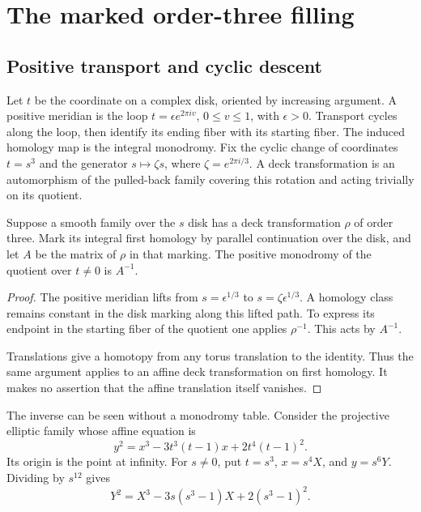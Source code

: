 \section{The marked order-three filling}\label{sec:order-three}

\subsection{Positive transport and cyclic descent}

Let $t$ be the coordinate on a complex disk, oriented by increasing
argument. A positive meridian is the loop $t=\epsilon e^{2\pi iv}$,
$0\le v\le1$, with $\epsilon>0$. Transport cycles along the loop, then identify its ending fiber with
its starting fiber. The induced homology map is the integral monodromy. Fix the cyclic change of coordinates $t=s^3$
and the generator $s\mapsto\zeta s$, where
$\zeta=e^{2\pi i/3}$. A deck transformation is an automorphism of
the pulled-back family covering this rotation and acting trivially
on its quotient.

\begin{lemma}\label{marked-local:lem:inverse-descent}
Suppose a smooth family over the $s$ disk has a deck transformation
$\rho$ of order three. Mark its integral first homology by parallel
continuation over the disk, and let $A$ be the matrix of $\rho$ in
that marking. The positive monodromy of the quotient over $t\ne0$
is $A^{-1}$.
\end{lemma}

\begin{proof}
The positive meridian lifts from $s=\epsilon^{1/3}$ to
$s=\zeta\epsilon^{1/3}$. A homology class remains constant in the
disk marking along this lifted path. To express its endpoint in the
starting fiber of the quotient one applies $\rho^{-1}$. This acts
by $A^{-1}$.

Translations give a homotopy from any torus translation to the identity.
Thus the same argument applies to an affine deck transformation on first homology. It makes no assertion
that the affine translation itself vanishes.
\end{proof}

The inverse can be seen without a monodromy table. Consider the
projective elliptic family whose affine equation is
\begin{equation}\label{marked-local:eq:weierstrass}
 y^2=x^3-3t^3(t-1)x+2t^4(t-1)^2.
\end{equation}
Its origin is the point at infinity. For $s\ne0$, put
$t=s^3$, $x=s^4X$, and $y=s^6Y$. Dividing by $s^{12}$ gives
\begin{equation}\label{marked-local:eq:good-equation}
 Y^2=X^3-3s(s^3-1)X+2(s^3-1)^2.
\end{equation}


